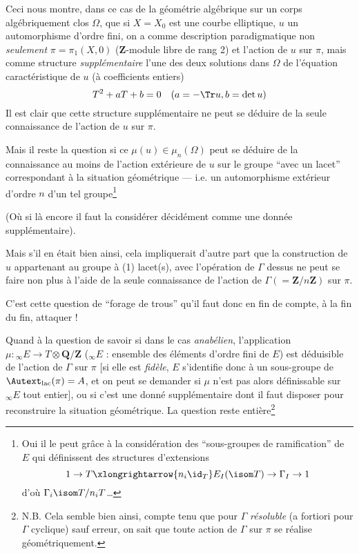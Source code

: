 Ceci nous montre, dans ce cas de la géométrie algébrique sur un corps algébriquement clos $\Omega$, que si $X = X_0$ est une courbe elliptique, $u$ un automorphisme d'ordre fini, on a comme description paradigmatique non \emph{seulement} $\pi = \pi_1 (X, 0)$ ($\mathbf{Z}$-module libre de rang 2) et l'action de $u$ sur $\pi$, mais comme structure \emph{supplémentaire} l'une des deux solutions dans $\Omega$ de l'équation caractéristique de $u$ (à coefficients entiers)
$$
T^2 + a T + b = 0 \quad (a = - \Tr u, b = \det u)
$$
Il est clair que cette structure supplémentaire ne peut se déduire de la seule connaissance de l'action de $u$ sur $\pi$.

Mais il reste la question si ce $\mu (u) \in \mu_n (\Omega)$ peut se déduire de la connaissance au moins de l'action extérieure de $u$ sur le groupe ``avec un lacet'' correspondant à la situation géométrique --- i.e. un automorphisme extérieur d'ordre $n$ d'un tel groupe\footnote{Oui il le peut grâce à la considération des ``sous-groupes de ramification'' de $E$ qui définissent des structures d'extensions
$$
1 \to T \xlongrightarrow{n_i \id_T} E_I (\isom T) \to \Gamma_I \to 1
$$
d'où $\Gamma_i \isom T/n_i T$\dots
}

(Où si là encore il faut la considérer décidément comme une donnée supplémentaire).

Mais s'il en était bien ainsi, cela impliquerait d'autre part que la construction de $u$ appartenant au groupe à (1) lacet(s), avec l'opération de $\Gamma$ dessus ne peut se faire non plus à l'aide de la seule connaissance de l'action de $\Gamma (= \mathbf{Z}/n \mathbf{Z})$ sur $\pi$.

C'est cette question de ``forage de trous'' qu'il faut donc en fin de compte, à la fin du fin, attaquer !

Quand à la question de savoir si dans le cas \emph{anabélien}, l'application $\mu: {}_\infty E \to T \otimes \mathbf{Q}/\mathbf{Z}$ (${}_\infty E$ : ensemble des éléments d'ordre fini de $E$) est déduisible de l'action de $\Gamma$ sur $\pi$ [si elle est \emph{fidèle}, $E$ s'identifie donc à un sous-groupe de $\Autext_{\text{lac}}(\pi) = A$, et on peut se demander si $\mu$ n'est pas alors définissable sur ${}_\infty E$ tout entier], ou si c'est une donné supplémentaire dont il faut disposer pour reconstruire la situation géométrique. La question reste entière\footnote{N.B. Cela semble bien ainsi, compte tenu que pour $\Gamma$ \emph{résoluble} (a fortiori pour $\Gamma$ cyclique) sauf erreur, on sait que toute action de $\Gamma$ sur $\pi$ se réalise géométriquement.}











